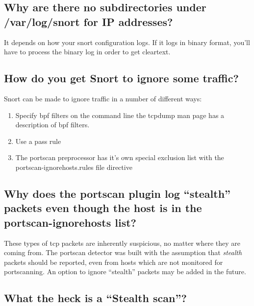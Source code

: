 \documentclass{article}
\begin{document}
\subsection{Why are there no subdirectories under /var/log/snort for IP addresses?}

It depends on how your snort configuration logs. If it logs in binary
format, you'll have to process the binary log in order to get cleartext.

\subsection{How do you get Snort to ignore some traffic?}

Snort can be made to ignore traffic in a number of different ways:
\begin{enumerate}
\item Specify bpf filters on the command line the tcpdump man page
 has a description of bpf filters.
\item Use a pass rule
\item The portscan preprocessor has it's own special exclusion list
 with the portscan-ignorehosts.rules file directive
\end{enumerate}

\subsection{Why does the portscan plugin log ``stealth'' packets even though the host is in the portscan-ignorehosts list? }

These types of tcp packets are inherently suspicious, no matter where
they are coming from.  The portscan detector was built with the assumption
that {\em stealth} packets should be reported, even from hosts which are not
monitored for portscanning.  An option to ignore ``stealth'' packets may be
added in the future.

\subsection{What the heck is a ``Stealth scan''?}
\end{document}
